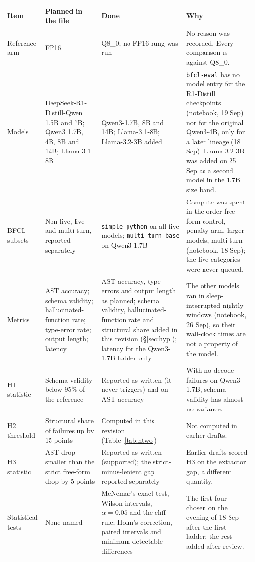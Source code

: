 \documentclass[12pt,letterpaper]{article}
\newcommand{\bfcl}{BFCL}
\newcommand{\qm}{Qwen3-1.7B}
\begin{document}
\begin{table}[p]
\centering\footnotesize
\begin{tabular}{@{}p{2.6cm}p{4.2cm}p{4.6cm}p{4.6cm}@{}}
\toprule
Item & Planned in the file & Done & Why \\
\midrule
Reference arm & FP16 & Q8\_0; no FP16 rung was run & No reason was recorded. Every comparison is against Q8\_0. \\
Models & DeepSeek-R1-Distill-Qwen 1.5B and 7B; Qwen3 1.7B, 4B, 8B and 14B; Llama-3.1-8B & Qwen3-1.7B, 8B and 14B; Llama-3.1-8B; Llama-3.2-3B added & \texttt{bfcl-eval} has no model entry for the R1-Distill checkpoints (notebook, 19 Sep) nor for the original Qwen3-4B, only for a later lineage (18 Sep). Llama-3.2-3B was added on 25 Sep as a second model in the 1.7B size band. \\
\bfcl{} subsets & Non-live, live and multi-turn, reported separately & \texttt{simple\_python} on all five models; \texttt{multi\_turn\_base} on \qm{} & Compute was spent in the order free-form control, penalty arm, larger models, multi-turn (notebook, 18 Sep); the live categories were never queued. \\
Metrics & AST accuracy; schema validity; hallucinated-function rate; type-error rate; output length; latency & AST accuracy, type errors and output length as planned; schema validity, hallucinated-function rate and structural share added in this revision (\S\ref{sec:hyp}); latency for the \qm{} ladder only & The other models ran in sleep-interrupted nightly windows (notebook, 26 Sep), so their wall-clock times are not a property of the model. \\
H1 statistic & Schema validity below 95\% of the reference & Reported as written (it never triggers) and on AST accuracy & With no decode failures on \qm{}, schema validity has almost no variance. \\
H2 threshold & Structural share of failures up by 15 points & Computed in this revision (Table~\ref{tab:htwo}) & Not computed in earlier drafts. \\
H3 statistic & AST drop smaller than the strict free-form drop by 5 points & Reported as written (supported); the strict-minus-lenient gap reported separately & Earlier drafts scored H3 on the extractor gap, a different quantity. \\
Statistical tests & None named & McNemar's exact test, Wilson intervals, $\alpha=0.05$ and the cliff rule; Holm's correction, paired intervals and minimum detectable differences & The first four chosen on the evening of 18 Sep after the first ladder; the rest added after review. \\

\end{tabular}
\end{table}
\end{document}
